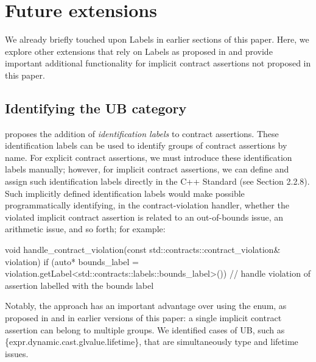 {\section{Future extensions}
\label{labels}

We already briefly touched upon Labels in earlier sections of this paper. Here, we explore other exten\-sions that rely on Labels as proposed in \cite{P3400R1} and provide important additional functionality for implicit contract assertions not proposed in this paper.

\subsection{Identifying the UB category}
\label{labels_cat}

\cite{P3400R1} proposes the addition of \emph{identification labels} to contract assertions. These identification labels can be used to identify groups of contract assertions by name. For explicit contract assertions, we must introduce these identification labels manually; however, for implicit contract assertions, we can define and assign such identification labels directly in the C++ Standard (see \cite{P3400R1} Section 2.2.8). Such implicitly defined identification labels would make possible programmatically identifying, in the contract-violation handler, whether the violated implicit contract assertion  is related to an out-of-bounds issue, an arithmetic issue, and so forth; for example:

\begin{codeblock}
void handle_contract_violation(const std::contracts::contract_violation& violation)
{
  if (auto* bounds_label =
      violation.getLabel<std::contracts::labels::bounds_label>()) {
      // handle violation of assertion labelled with the bounds label
  }
}
\end{codeblock} 

%
%

Notably, the \cite{P3400R1} approach has an important advantage over using the  enum, as proposed in \cite{P3081R1} and in earlier versions of this paper: a single implicit contract assertion can belong to multiple groups. We identified cases of UB, such as \{expr.dynamic.cast.glvalue.lifetime\}, that are simultaneously type and lifetime issues.

}
